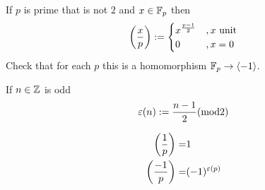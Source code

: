 \begin{dfn}
    If $p$ is prime that is not $2$ and $x \in \mathbb{F}_p$ then
    \[\left(\frac{x}{p}\right) := 
    \begin{cases}
        x^{\frac{p-1}{2}} &, x \text{ unit}\\
        0 &, x = 0
    \end{cases}\]
    Check that for each $p$ this is a homomorphism $\mathbb{F}_p \to \langle-1\rangle$.
\end{dfn}

\begin{dfn}[$\ep(n)$]
    If $n \in \mathbb{Z}$ is odd 
    \[\varepsilon(n):=\frac{n-1}{2} (\mathrm{mod} 2)\]
\end{dfn}

\begin{prop}[Computations]
    \begin{align*}
        \left(\frac{1}{p}\right) =& 1\\
        \left(\frac{-1}{p}\right) =& (-1)^{\varepsilon(p)}
    \end{align*}
\end{prop}

